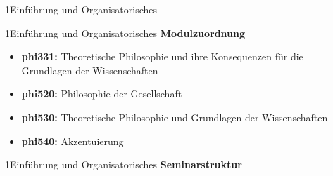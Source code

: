 \documentclass[xcolor=table,9pt,aspectratio=169]{beamer}
\begin{document}
\begin{frame}
\begin{overlayarea}{\textwidth}{0.81\paperheight}{
   \vspace*{11mm}
   \textcolor{uolblue}
   {1\hspace*{1em}Einführung und Organisatorisches}
}
\end{overlayarea}
\end{frame}


\begin{frame}{\vspace*{10mm}1\hspace*{1em}Einführung und Organisatorisches}
\textbf{Modulzuordnung}\\
\begin{itemize}
   \item \textbf{phi331:} Theoretische Philosophie und ihre Konsequenzen für die\\Grundlagen der Wissenschaften
   \item \textbf{phi520:} Philosophie der Gesellschaft
   \item \textbf{phi530:} Theoretische Philosophie und Grundlagen der Wissenschaften
   \item \textbf{phi540:} Akzentuierung
\end{itemize}
\end{frame}


\begin{frame}{\vspace*{10mm}1\hspace*{1em}Einführung und Organisatorisches}
\textbf{Seminarstruktur}\\
\begin{flushleft}
\end{flushleft}
\end{frame}
\end{document}
